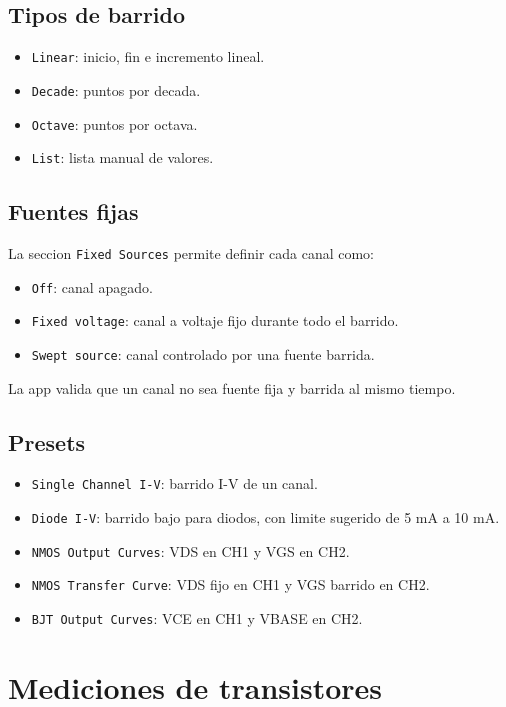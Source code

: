 \documentclass[11pt,letterpaper]{article}
\begin{document}
\subsection{Tipos de barrido}

\begin{itemize}
  \item \texttt{Linear}: inicio, fin e incremento lineal.
  \item \texttt{Decade}: puntos por decada.
  \item \texttt{Octave}: puntos por octava.
  \item \texttt{List}: lista manual de valores.
\end{itemize}

\subsection{Fuentes fijas}

La seccion \texttt{Fixed Sources} permite definir cada canal como:

\begin{itemize}
  \item \texttt{Off}: canal apagado.
  \item \texttt{Fixed voltage}: canal a voltaje fijo durante todo el barrido.
  \item \texttt{Swept source}: canal controlado por una fuente barrida.
\end{itemize}

La app valida que un canal no sea fuente fija y barrida al mismo tiempo.

\subsection{Presets}

\begin{itemize}
  \item \texttt{Single Channel I-V}: barrido I-V de un canal.
  \item \texttt{Diode I-V}: barrido bajo para diodos, con limite sugerido de
        5 mA a 10 mA.
  \item \texttt{NMOS Output Curves}: VDS en CH1 y VGS en CH2.
  \item \texttt{NMOS Transfer Curve}: VDS fijo en CH1 y VGS barrido en CH2.
  \item \texttt{BJT Output Curves}: VCE en CH1 y VBASE en CH2.
\end{itemize}

\section{Mediciones de transistores}
\end{document}
